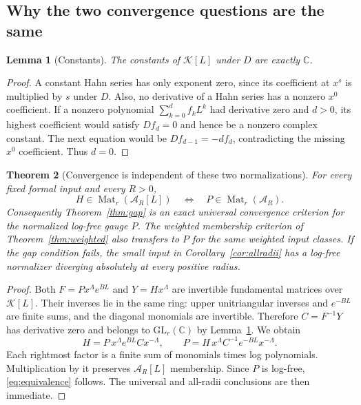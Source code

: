 \documentclass[11pt,a4paper]{article}
\numberwithin{equation}{section}
\newtheorem{theorem}{Theorem}[section]
\newtheorem{lemma}[theorem]{Lemma}
\theoremstyle{definition}
\theoremstyle{remark}
\newcommand{\C}{\mathbb C}
\newcommand{\K}{\mathcal K}
\newcommand{\A}{\mathcal A}
\newcommand{\Mat}{\operatorname{Mat}}
\begin{document}
\subsection{Why the two convergence questions are the same}
\begin{lemma}[Constants]\label{lem:constants}
The constants of $\K[L]$ under $D$ are exactly $\C$.
\end{lemma}
\begin{proof}
A constant Hahn series has only exponent zero, since its coefficient at
$x^s$ is multiplied by $s$ under $D$. Also, no derivative of a Hahn series
has a nonzero $x^0$ coefficient. If a nonzero polynomial
$\sum_{k=0}^d f_kL^k$ had derivative zero and $d>0$, its highest coefficient
would satisfy $Df_d=0$ and hence be a nonzero complex constant. The next
equation would be $Df_{d-1}=-df_d$, contradicting the missing $x^0$
coefficient. Thus $d=0$.
\end{proof}

\begin{theorem}[Convergence is independent of these two normalizations]
\label{thm:gauge-equivalence}
For every fixed formal input and every $R>0$,
\begin{equation}\label{eq:equivalence}
 H\in\Mat_r(\A_R[L])
 \quad\Longleftrightarrow\quad P\in\Mat_r(\A_R).
\end{equation}
Consequently Theorem~\ref{thm:gap} is an exact universal convergence
criterion for the normalized log-free gauge $P$. The weighted membership
criterion of Theorem~\ref{thm:weighted} also transfers to $P$ for the same
weighted input classes. If the gap condition fails, the small input in
Corollary~\ref{cor:allradii} has a log-free normalizer diverging absolutely
at every positive radius.
\end{theorem}
\begin{proof}
Both $F=P x^\Lambda e^{BL}$ and $Y=Hx^\Lambda$ are invertible fundamental
matrices over $\K[L]$. Their inverses lie in the same ring: upper
unitriangular inverses and $e^{-BL}$ are finite sums, and the diagonal
monomials are invertible. Therefore
$C=F^{-1}Y$ has derivative zero and belongs to $\mathrm{GL}_r(\C)$ by
Lemma~\ref{lem:constants}. We obtain
\begin{equation}\label{eq:factorcomparison}
 H=P\,x^\Lambda e^{BL}C x^{-\Lambda},\qquad
 P=H\,x^\Lambda C^{-1}e^{-BL}x^{-\Lambda}.
\end{equation}
Each rightmost factor is a finite sum of monomials times log polynomials.
Multiplication by it preserves $\A_R[L]$ membership. Since $P$ is
log-free, \eqref{eq:equivalence} follows. The universal and all-radii
conclusions are then immediate.
\end{proof}
\end{document}
